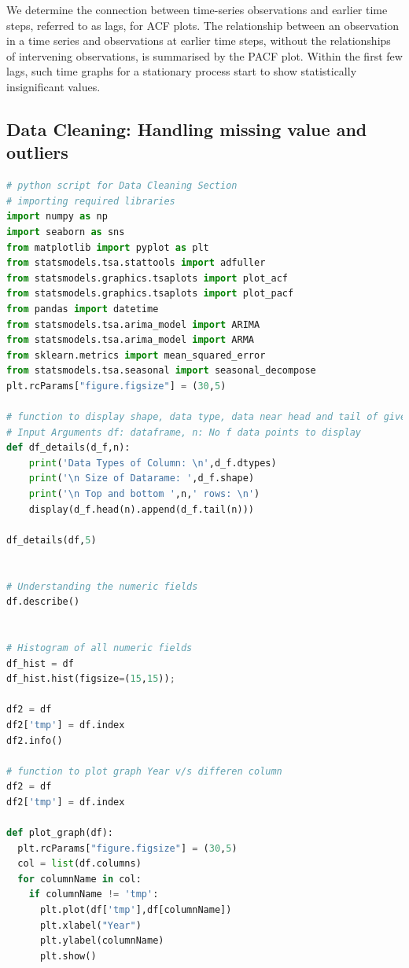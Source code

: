 We determine the connection between time-series observations and earlier time steps, referred to as lags, for ACF plots. The relationship between an observation in a time series and observations at earlier time steps, without the relationships of intervening observations, is summarised by the PACF plot. Within the first few lags, such time graphs for a stationary process start to show statistically insignificant values.

\subsection{Data Cleaning: Handling missing value and outliers}


\begin{lstlisting}[language=Python]
# python script for Data Cleaning Section
# importing required libraries
import numpy as np
import seaborn as sns
from matplotlib import pyplot as plt
from statsmodels.tsa.stattools import adfuller
from statsmodels.graphics.tsaplots import plot_acf
from statsmodels.graphics.tsaplots import plot_pacf
from pandas import datetime
from statsmodels.tsa.arima_model import ARIMA
from statsmodels.tsa.arima_model import ARMA
from sklearn.metrics import mean_squared_error
from statsmodels.tsa.seasonal import seasonal_decompose
plt.rcParams["figure.figsize"] = (30,5)

# function to display shape, data type, data near head and tail of given data fram.
# Input Arguments df: dataframe, n: No f data points to display
def df_details(d_f,n):
    print('Data Types of Column: \n',d_f.dtypes)
    print('\n Size of Datarame: ',d_f.shape)
    print('\n Top and bottom ',n,' rows: \n')
    display(d_f.head(n).append(d_f.tail(n)))

df_details(df,5) 


# Understanding the numeric fields
df.describe()


# Histogram of all numeric fields
df_hist = df
df_hist.hist(figsize=(15,15));

df2 = df
df2['tmp'] = df.index
df2.info()

# function to plot graph Year v/s differen column
df2 = df
df2['tmp'] = df.index

def plot_graph(df):
  plt.rcParams["figure.figsize"] = (30,5)
  col = list(df.columns)
  for columnName in col:
    if columnName != 'tmp':
      plt.plot(df['tmp'],df[columnName])
      plt.xlabel("Year")
      plt.ylabel(columnName)
      plt.show()




\end{lstlisting}
